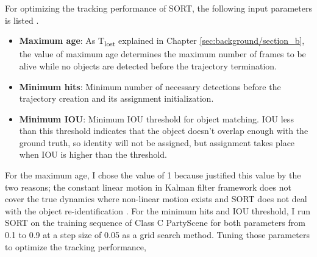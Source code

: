 For optimizing the tracking performance of SORT, the following input parameters is listed \cite{bewley_simple_2016}.
\begin{itemize}
    \item \textbf{Maximum age}: As T\textsubscript{lost} explained in Chapter \ref{sec:background/section_b}, the value of maximum age determines the maximum number of frames to be alive while no objects are detected before the trajectory termination.
    \item \textbf{Minimum hits}: Minimum number of necessary detections before the trajectory creation and its assignment initialization.
    \item \textbf{Minimum IOU}: Minimum IOU threshold for object matching. IOU less than this threshold indicates that the object doesn't overlap enough with the ground truth, so identity will not be assigned, but assignment takes place when IOU is higher than the threshold.
\end{itemize}
For the maximum age, I chose the value of 1 because \citeauthor{bewley_simple_2016} justified this value by the two reasons; the constant linear motion in Kalman filter framework does not cover the true dynamics where non-linear motion exists and SORT does not deal with the object re-identification \cite{bewley_simple_2016}. For the minimum hits and IOU threshold, I run SORT on the training sequence of Class C PartyScene for both parameters from 0.1 to 0.9 at a step size of 0.05 as a grid search method. Tuning those parameters to optimize the tracking performance, 